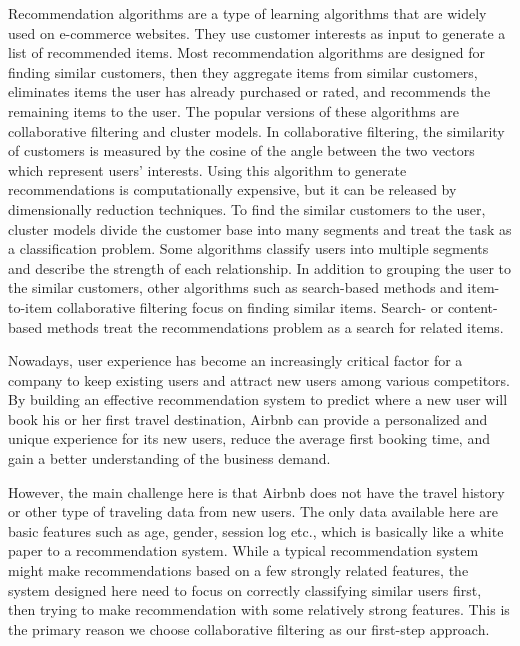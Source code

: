 \documentclass{sig-alternate-05-2015}
\begin{document}
Recommendation algorithms are a type of learning algorithms that are widely used on e-commerce websites.  They use customer interests as input to generate a list of recommended items. Most recommendation algorithms are designed for finding similar customers, then they aggregate items from similar customers, eliminates items the user has already purchased or rated, and recommends the remaining items to the user. The popular versions of these algorithms are collaborative filtering and cluster models. In collaborative filtering, the similarity of customers is measured by the cosine of the angle between the two vectors which represent users' interests\cite{analysis}. Using this algorithm to generate recommendations is computationally expensive, but it can be released by dimensionally reduction techniques\cite{collaborative}. To find the similar customers to the user, cluster models divide the customer base into many segments and treat the task as a classification problem\cite{clustering}.  Some algorithms classify users into multiple segments and describe the strength of each relationship\cite{cf}. In addition to grouping the user to the similar customers, other algorithms such as search-based methods and item-to-item collaborative filtering focus on finding similar items\cite{item2item}. Search- or content-based methods treat the recommendations problem as a search for related items\cite{massive}.

Nowadays, user experience has become an increasingly critical factor for a company to keep existing users and attract new users among various competitors. By building an effective recommendation system to predict where a new user will book his or her first travel destination, Airbnb can provide a personalized and unique experience for its new users, reduce the average first booking time, and gain a better understanding of the business demand. 


However, the main challenge here is that Airbnb does not have the travel history or other type of traveling data from new users. The only data available here are basic features such as age, gender, session log etc., which is basically like a white paper to a recommendation system. While a typical recommendation system might make recommendations based on a few strongly related features, the system designed here need to focus on correctly classifying similar users first, then trying to make recommendation with some relatively strong features. This is the primary reason we choose collaborative filtering as our first-step approach.
\end{document}
